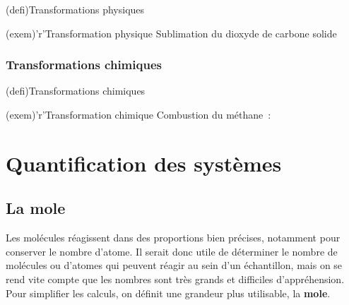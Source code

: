 \documentclass[../../main/main.tex]{subfiles}
\begin{document}
\begin{tcbraster}[raster columns=2, raster equal height=rows]
	\begin{tcb}[label=def:transnuc](defi){Transformations physiques}
	\end{tcb}
	\begin{tcb}[label=exem:transnuc](exem)'r'{Transformation physique}
		Sublimation du dioxyde de carbone solide
		\vspace{-15pt}
	\end{tcb}
\end{tcbraster}

\subsubsection{Transformations chimiques}

\begin{tcbraster}[raster columns=2, raster equal height=rows]
	\begin{tcb}[label=def:transnuc](defi){Transformations chimiques}
	\end{tcb}
	\begin{tcb}[label=exem:transnuc](exem)'r'{Transformation chimique}
		Combustion du méthane~:
		\psw{
			\[
				\ce{CH4\gaz{} + 2O2\gaz{} = CO2\gaz{} + 2H2O\gaz{}}
			\]
		}
	\end{tcb}
	\vspace{-15pt}
\end{tcbraster}

\section{Quantification des systèmes}
\subsection{La mole}

Les molécules réagissent dans des proportions bien précises, notamment pour
conserver le nombre d'atome. Il serait donc utile de déterminer le nombre de
molécules ou d'atomes qui peuvent réagir au sein d'un échantillon, mais on se
rend vite compte que les nombres sont très grands et difficiles d'appréhension.
Pour simplifier les calculs, on définit une grandeur plus utilisable, la
\textbf{mole}.
\end{document}

